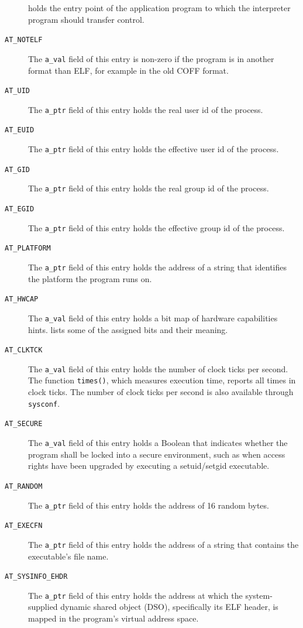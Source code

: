 \documentclass[USenglish,fontsize=11pt,twoside,%
  toc=bib,toc=idx,toc=graduated,numbers=noendperiod,
  bookmarks=true,
  bookmarksnumbered=true,
  bookmarksopen=true,
  bookmarksopenlevel=1,
  breaklinks=true,
  colorlinks=true,
  linkcolor=black,
  pdfpagelayout={TwoPageRight},
  pdfusetitle=true
]{scrreprt}
\begin{document}
\begin{description}
  holds the entry point of the application program to which the
  interpreter program should transfer control.
\item[\texttt{AT\_NOTELF}] The \texttt{a\_val} field of this entry is
  non-zero if the program is in another format than ELF, for example
  in the old COFF format.
\item[\texttt{AT\_UID}] The \texttt{a\_ptr} field of this entry holds
  the real user id of the process.
\item[\texttt{AT\_EUID}] The \texttt{a\_ptr} field of this entry holds
  the effective user id of the process.
\item[\texttt{AT\_GID}] The \texttt{a\_ptr} field of this entry holds
  the real group id of the process.
\item[\texttt{AT\_EGID}] The \texttt{a\_ptr} field of this entry holds
  the effective group id of the process.
\item[\texttt{AT\_PLATFORM}] The \texttt{a\_ptr} field of this entry holds
  the address of a string that identifies the platform the program runs
  on.
\item[\texttt{AT\_HWCAP}] The \texttt{a\_val} field of this entry holds a
  bit map of hardware capabilities hints.
   lists some of the assigned bits and their meaning.
\item[\texttt{AT\_CLKTCK}] The \texttt{a\_val} field of this entry holds
  the number of clock ticks per second.  The function \texttt{times()},
  which measures execution time, reports all times in clock ticks.  The
  number of clock ticks per second is also available through
  \texttt{sysconf}.
\item[\texttt{AT\_SECURE}] The \texttt{a\_val} field of this entry holds a
  Boolean that indicates whether the program shall be locked into a secure
  environment, such as when access rights have been upgraded by executing
  a setuid/setgid executable.
\item[\texttt{AT\_RANDOM}] The \texttt{a\_ptr} field of this entry holds
  the address of 16 random bytes.
\item[\texttt{AT\_EXECFN}] The \texttt{a\_ptr} field of this entry holds
  the address of a string that contains the executable's file name.
\item[\texttt{AT\_SYSINFO\_EHDR}] The \texttt{a\_ptr} field of this entry
  holds the address at which the system-supplied dynamic shared object
  (DSO), specifically its ELF header, is mapped in the program's virtual
  address space.
\end{description}
\end{document}
